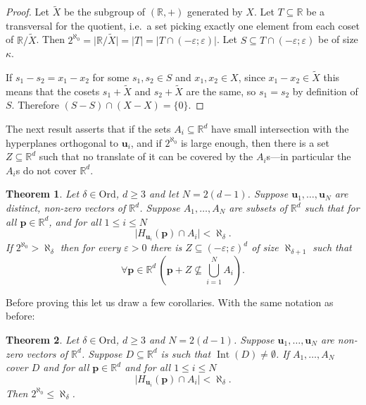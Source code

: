 \documentclass[12pt]{amsart}
\DeclareMathOperator{\Int}{Int} 		%
\newcommand{\FORALL}[1]{\forall {#1} \, }
\newcommand{\R}{\mathbb{R}}	%
\newcommand{\set}[1]{\mathopen \{ {#1} \mathclose \}} %
\newcommand{\card}[1]{\mathopen | #1 \mathclose |}		%
\newcommand{\On}{\mathord{\mathrm{Ord}}}		%
\theoremstyle{plain}
\newtheorem{theorem}{Theorem}[section]
\theoremstyle{definition}
\theoremstyle{remark}
\begin{document}
\begin{proof}
Let \( \tilde{X} \) be the subgroup of \( ( \R , + ) \) generated by \( X \).
Let \( T \subseteq \R \) be a transversal for the quotient, i.e.~a set picking exactly one element from each coset of \( \R / \tilde{X} \).
Then \(  2^{\aleph_0} = \card{ \R / \tilde{X} } = \card{T} = \card{T \cap ( - \varepsilon ; \varepsilon )} \).
Let \( S \subseteq T \cap ( - \varepsilon ; \varepsilon ) \) be of size \( \kappa \).

If \( s_1 - s_2 = x_1 - x_2 \) for some \( s_1 , s_2 \in S \) and \( x_1 , x_2 \in X \), since \( x_1 - x_2 \in \tilde{X} \) this means that the cosets \( s_1 + \tilde{X} \) and \( s_2 + \tilde{X} \) are the same, so \( s_1 = s_2 \) by definition of \( S \).
Therefore \( ( S - S ) \cap ( X - X ) = \set{ 0 } \). 
\end{proof}

The next result asserts that if the sets \( A_i \subseteq \R^d \) have small intersection with the hyperplanes orthogonal to \( \mathbf{u}_i \), and if \( 2^{\aleph_0} \) is large enough, then there is a set \( Z \subseteq \R^d \) such that no translate of it can be covered by the \( A_i \)s---in particular the \( A_i \)s do not cover \( \R^d \).

\begin{theorem}\label{th:EJM-Rd}
Let \( \delta \in \On \), \( d \geq 3 \) and let \( N = 2 ( d - 1 ) \).
Suppose \( \mathbf{u}_1 , \dots , \mathbf{u}_N \) are distinct, non-zero vectors of \( \R^d \).
Suppose \( A_1 , \dots , A_N \) are subsets of \( \R^d \) such that for all \( \mathbf{p} \in \R^d \), and for all \( 1 \leq i \leq N \)
\[
\card{ H_{\mathbf{u}_i} ( \mathbf{p} ) \cap A_i } < \aleph_ \delta . 
\]
If \( 2^{\aleph_0 } > \aleph_{ \delta } \) then for every \( \varepsilon > 0 \) there is \( Z \subseteq ( - \varepsilon ; \varepsilon ) ^ d \) of size \( \aleph_{ \delta + 1 } \) such that 
\[
\FORALL{ \mathbf{p} \in \R^d } ( \mathbf{p} + Z \nsubseteq \textstyle \bigcup_{i = 1 }^N A_i ) . 
\]
\end{theorem}

Before proving this let us draw a few corollaries.
With the same notation as before:

\begin{theorem}\label{th:EJM-Rd-1}
Let \( \delta \in \On \), \( d \geq 3 \) and \( N = 2 ( d - 1 ) \).
Suppose \( \mathbf{u}_1 , \dots , \mathbf{u}_N \) are non-zero vectors of \( \R^d \).
Suppose \( D \subseteq \R^d \) is such that \( \Int ( D ) \neq \emptyset \).
If \( A_1 , \dots , A_N \) cover \( D \) and for all \( \mathbf{p} \in \R^d \) and for all \( 1 \leq i \leq N \)
\[
\card{ H_{\mathbf{u}_i} ( \mathbf{p} ) \cap A_i } < \aleph_ \delta .
\]
Then \( 2^{\aleph_0} \leq \aleph_{ \delta } \).
\end{theorem}
\end{document}
